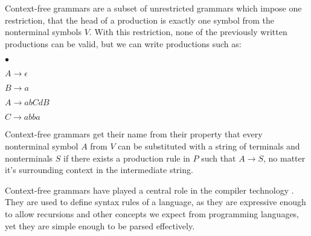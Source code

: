 Context-free grammars are a subset of unrestricted grammars which impose one restriction, that the head of a production is exactly one symbol from the nonterminal symbols $V$. With this restriction, none of the previously written productions can be valid, but we can write productions such as:
\begin{list}{$\bullet$}{}  	
	\item $A \rightarrow \epsilon$
	\item $B \rightarrow a$
	\item $A \rightarrow abCdB$
	\item $C \rightarrow abba$
\end{list}

Context-free grammars get their name from their property that every nonterminal symbol $A$ from $V$ can be substituted with a string of terminals and nonterminals $S$ if there exists a production rule in $P$ such that $A \rightarrow S$, no matter it's surrounding context in the intermediate string.

Context-free grammars have played a central role in the compiler technology \citep{hopcroft2007automatatheory}. They are used to define syntax rules of a language, as they are expressive enough to allow recursions and other concepts we expect from programming languages, yet they are simple enough to be parsed effectively.